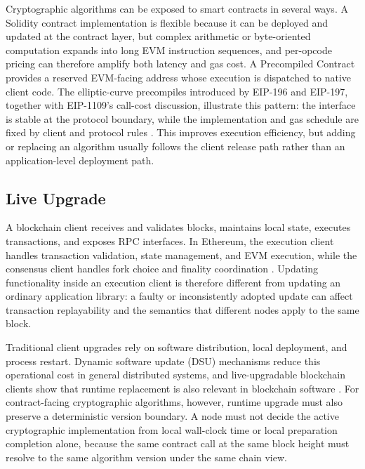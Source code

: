 \documentclass[pdflatex,sn-mathphys-num]{sn-jnl}%
\theoremstyle{thmstyleone}%
\theoremstyle{thmstyletwo}%
\theoremstyle{thmstylethree}%
\begin{document}
Cryptographic algorithms can be exposed to smart contracts in several ways. A Solidity contract implementation is flexible because it can be deployed and updated at the contract layer, but complex arithmetic or byte-oriented computation expands into long EVM instruction sequences, and per-opcode pricing can therefore amplify both latency and gas cost. A Precompiled Contract provides a reserved EVM-facing address whose execution is dispatched to native client code. The elliptic-curve precompiles introduced by EIP-196 and EIP-197, together with EIP-1109's call-cost discussion, illustrate this pattern: the interface is stable at the protocol boundary, while the implementation and gas schedule are fixed by client and protocol rules \cite{eip196,eip197,eip1109,evmCodesPrecompiled}. This improves execution efficiency, but adding or replacing an algorithm usually follows the client release path rather than an application-level deployment path.

\subsection{Live Upgrade}\label{sec2.2}
A blockchain client receives and validates blocks, maintains local state, executes transactions, and exposes RPC interfaces. In Ethereum, the execution client handles transaction validation, state management, and EVM execution, while the consensus client handles fork choice and finality coordination \cite{ethereumNodeArchitecture,gethHome}. Updating functionality inside an execution client is therefore different from updating an ordinary application library: a faulty or inconsistently adopted update can affect transaction replayability and the semantics that different nodes apply to the same block.

Traditional client upgrades rely on software distribution, local deployment, and process restart. Dynamic software update (DSU) mechanisms reduce this operational cost in general distributed systems, and live-upgradable blockchain clients show that runtime replacement is also relevant in blockchain software \cite{ajmani2006modular,baresi2017versionConsistency,wang2023phoenix}. For contract-facing cryptographic algorithms, however, runtime upgrade must also preserve a deterministic version boundary. A node must not decide the active cryptographic implementation from local wall-clock time or local preparation completion alone, because the same contract call at the same block height must resolve to the same algorithm version under the same chain view.
\end{document}
